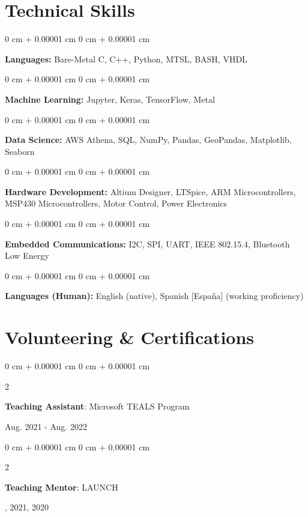 \documentclass[10pt, letterpaper]{article}
\newenvironment{onecolentry}{
    \begin{adjustwidth}{
        0 cm + 0.00001 cm
    }{
        0 cm + 0.00001 cm
    }
}{
    \end{adjustwidth}
} %
\newenvironment{twocolentry}[2][]{
    \onecolentry
    \def\secondColumn{#2}
    \setcolumnwidth{\fill, 4.5 cm}
    \begin{paracol}{2}
}{
    \switchcolumn \raggedleft \secondColumn
    \end{paracol}
    \endonecolentry
} %
\begin{document}

    
    \section{Technical Skills}
        
        \begin{onecolentry}
            \textbf{Languages:} Bare-Metal C, C++, Python, MTSL, BASH, VHDL
        \end{onecolentry}

        \begin{onecolentry}
            \textbf{Machine Learning:} Jupyter, Keras, TensorFlow, Metal
        \end{onecolentry}

        \begin{onecolentry}
            \textbf{Data Science:} AWS Athena, SQL, NumPy, Pandas, GeoPandas, Matplotlib, Seaborn
        \end{onecolentry}

        \begin{onecolentry}
            \textbf{Hardware Development:} Altium Designer, LTSpice, ARM Microcontrollers, MSP430 Microcontrollers, Motor Control, Power Electronics
        \end{onecolentry}

        \begin{onecolentry}
            \textbf{Embedded Communications:} I2C, SPI, UART, IEEE 802.15.4, Bluetooth Low Energy
        \end{onecolentry}

        \begin{onecolentry}
            \textbf{Languages (Human):} English (native), Spanish [Espa\~{n}a] (working proficiency)
        \end{onecolentry}

    \section{Volunteering \& Certifications}

        \begin{twocolentry}{
            Aug. 2021 - Aug. 2022
        }
            \textbf{Teaching Assistant}: Microsoft TEALS Program
        \end{twocolentry}

        \begin{twocolentry}{
            2022, 2021, 2020
        }
            \textbf{Teaching Mentor}: LAUNCH
        \end{twocolentry}
\end{document}
